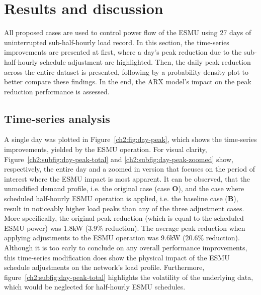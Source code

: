 \section{Results and discussion}
\label{ch2:sec:results}

All proposed cases are used to control power flow of the ESMU using 27 days of uninterrupted sub-half-hourly load record.
In this section, the time-series improvements are presented at first, where a day's peak reduction due to the sub-half-hourly schedule adjustment are highlighted.
Then, the daily peak reduction across the entire dataset is presented, following by a probability density plot to better compare these findings.
In the end, the ARX model's impact on the peak reduction performance is assessed.

\subsection{Time-series analysis}



A single day was plotted in Figure~\ref{ch2:fig:day-peak}, which shows the time-series improvements, yielded by the ESMU operation.
For visual clarity, Figure~\ref{ch2:subfig:day-peak-total} and \ref{ch2:subfig:day-peak-zoomed} show, respectively, the entire day and a zoomed in version that focuses on the period of interest where the ESMU impact is most apparent.
It can be observed, that the unmodified demand profile, i.e. the original case (case \textbf{O}), and the case where scheduled half-hourly ESMU operation is applied, i.e. the  baseline case (\textbf{B}), result in noticeably higher load peaks than any of the three adjustment cases.
More specifically, the original peak reduction (which is equal to the scheduled ESMU power) was 1.8kW (3.9\% reduction).
The average peak reduction when applying adjustments to the ESMU operation was 9.6kW (20.6\% reduction).
Although it is too early to conclude on any overall performance improvements, this time-series modification does show the physical impact of the ESMU schedule adjustments on the network's load profile.
Furthermore, figure~\ref{ch2:subfig:day-peak-total} highlights the volatility of the underlying data, which would be neglected for half-hourly ESMU schedules.

